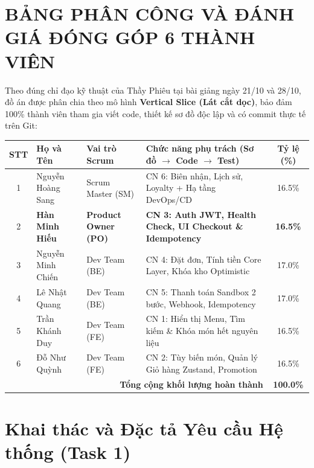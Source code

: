 \documentclass[12pt,a4paper]{article}
\begin{document}
\section*{BẢNG PHÂN CÔNG VÀ ĐÁNH GIÁ ĐÓNG GÓP 6 THÀNH VIÊN}

Theo đúng chỉ đạo kỹ thuật của Thầy Phiêu tại bài giảng ngày 21/10 và 28/10, đồ án được phân chia theo mô hình \textbf{Vertical Slice (Lát cắt dọc)}, bảo đảm 100\% thành viên tham gia viết code, thiết kế sơ đồ độc lập và có commit thực tế trên Git:

\begin{table}[h!]
\centering
\small
\begin{tabularx}{\textwidth}{clllc}
\toprule
\textbf{STT} & \textbf{Họ và Tên} & \textbf{Vai trò Scrum} & \textbf{Chức năng phụ trách (Sơ đồ $\rightarrow$ Code $\rightarrow$ Test)} & \textbf{Tỷ lệ (\%)} \\
\midrule
1 & Nguyễn Hoàng Sang & Scrum Master (SM) & CN 6: Biên nhận, Lịch sử, Loyalty + Hạ tầng DevOps/CD & 16.5\% \\
2 & \textbf{Hàn Minh Hiếu} & \textbf{Product Owner (PO)} & \textbf{CN 3: Auth JWT, Health Check, UI Checkout \& Idempotency} & \textbf{16.5\%} \\
3 & Nguyễn Minh Chiến & Dev Team (BE) & CN 4: Đặt đơn, Tính tiền Core Layer, Khóa kho Optimistic & 17.0\% \\
4 & Lê Nhật Quang & Dev Team (BE) & CN 5: Thanh toán Sandbox 2 bước, Webhook, Idempotency & 17.0\% \\
5 & Trần Khánh Duy & Dev Team (FE) & CN 1: Hiển thị Menu, Tìm kiếm \& Khóa món hết nguyên liệu & 16.5\% \\
6 & Đỗ Như Quỳnh & Dev Team (FE) & CN 2: Tùy biến món, Quản lý Giỏ hàng Zustand, Promotion & 16.5\% \\
\midrule
\multicolumn{4}{r}{\textbf{Tổng cộng khối lượng hoàn thành}} & \textbf{100.0\%} \\
\bottomrule
\end{tabularx}
\end{table}

\section{Khai thác và Đặc tả Yêu cầu Hệ thống (Task 1)}
\end{document}
